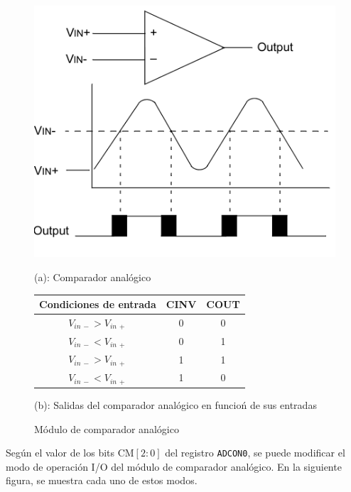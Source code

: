 \begin{figure}[!h]
    \centering
    \begin{minipage}{0.4\linewidth}
        \includegraphics[width = 0.9\linewidth]{imagenes/fig6a.png}
        \caption*{(a): Comparador analógico}
    \end{minipage}%
    \begin{minipage}{0.4\linewidth}
        \begin{tabular}{ccc}
            \toprule
            Condiciones de entrada   & CINV & COUT\\
            \midrule
            $V _{in\,-} > V _{in\,+}$ & 0    & 0\\ 
            $V _{in\,-} < V _{in\,+}$ & 0    & 1\\ 
            $V _{in\,-} > V _{in\,+}$ & 1    & 1\\ 
            $V _{in\,-} < V _{in\,+}$ & 1    & 0\\
            \bottomrule
        \end{tabular}
        \caption*{(b): Salidas del comparador analógico en funcioń de sus entradas}
    \end{minipage}
    \caption{Módulo de comparador analógico}
    \label{fig6}
\end{figure}

Según el valor de los bits CM$[2:0]$ del registro \texttt{ADCON0}, se puede modificar el modo de operación I/O del módulo de comparador analógico. En la siguiente figura, se muestra cada uno de estos modos. 

